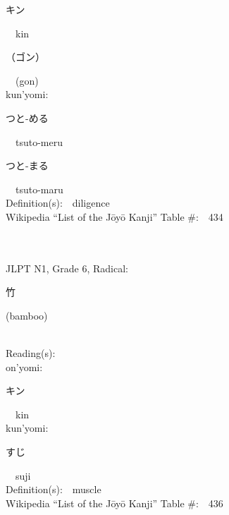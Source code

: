 \begin{multicols}{2}
{\hspace*{2em}}{\begin{CJK}{UTF8}{min} キン \end{CJK}}\ \ kin\ \ \\
{\hspace*{2em}}{\begin{CJK}{UTF8}{min} （ゴン） \end{CJK}}\ \ (gon)\ \ \\
{\hspace*{1em}}kun'yomi:\ \ \\
{\hspace*{2em}}{\begin{CJK}{UTF8}{min} つと-める \end{CJK}}\ \ tsuto-meru\ \ \\
{\hspace*{2em}}{\begin{CJK}{UTF8}{min} つと-まる \end{CJK}}\ \ tsuto-maru\ \ \\
Definition(s):\ \ diligence \\
Wikipedia ``List of the J\=oy\=o Kanji'' Table \#:\ \ 434 \\
\ \ \\
{\fontsize{34pt}{40pt}  }\ \ \\  %
{JLPT N1, Grade 6, Radical:\ \ {\begin{CJK}{UTF8}{min} 竹 \end{CJK}} (bamboo) } \\
Reading(s):\ \ \\
{\hspace*{1em}}on'yomi:\ \ \\
{\hspace*{2em}}{\begin{CJK}{UTF8}{min} キン \end{CJK}}\ \ kin\ \ \\
{\hspace*{1em}}kun'yomi:\ \ \\
{\hspace*{2em}}{\begin{CJK}{UTF8}{min} すじ \end{CJK}}\ \ suji\ \ \\
Definition(s):\ \ muscle \\
Wikipedia ``List of the J\=oy\=o Kanji'' Table \#:\ \ 436 \\

\end{multicols}
